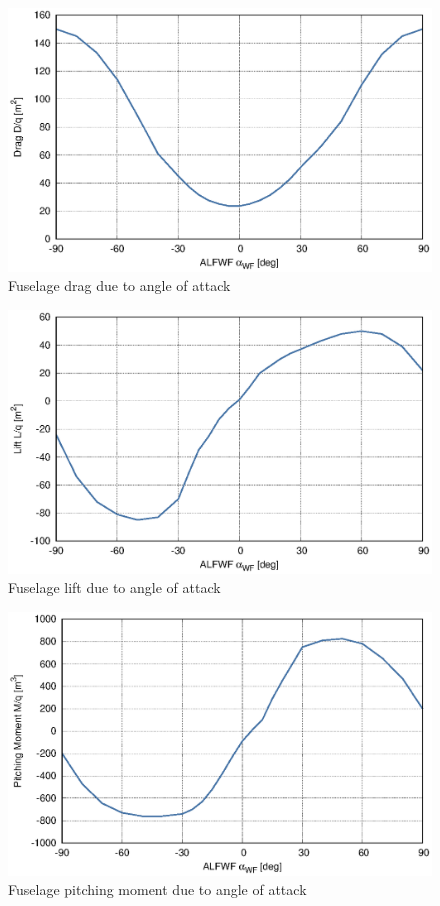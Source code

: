 \begin{figure}
  \centering
  \includegraphics[width=140mm]{eps/uh60_fuselage_alfwf_dqfmp.eps}
  \caption{Fuselage drag due to angle of attack \cite{NASA-CR-166309}}
\end{figure}

\begin{figure}
  \centering
  \includegraphics[width=140mm]{eps/uh60_fuselage_alfwf_lqfmp.eps}
  \caption{Fuselage lift due to angle of attack \cite{NASA-CR-166309}}
\end{figure}

\begin{figure}
  \centering
  \includegraphics[width=140mm]{eps/uh60_fuselage_alfwf_mqfmp.eps}
  \caption{Fuselage pitching moment due to angle of attack \cite{NASA-CR-166309}}
\end{figure}

